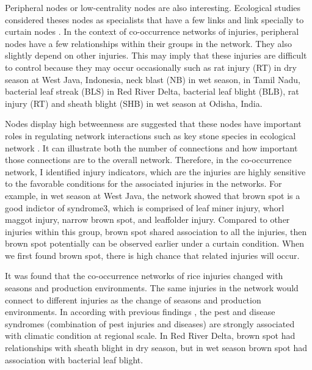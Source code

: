 Peripheral nodes or low-centrality nodes are also interesting. Ecological studies considered theses nodes as specialists that have a few links and link specially to curtain nodes \citep{Lu_2013_Soil, Borthagaray_2014_Inferring}. In the context of co-occurrence networks of injuries, peripheral nodes have a few relationships within their groups in the network. They also slightly depend on other injuries. This may imply that these injuries are difficult to control because they may occur occasionally such as rat injury (RT) in dry season at West Java, Indonesia, neck blast (NB) in wet season, in Tamil Nadu, bacterial leaf streak (BLS) in Red River Delta, bacterial leaf blight (BLB), rat injury (RT) and sheath blight (SHB) in wet season at Odisha, India.

Nodes display high betweenness are suggested that these nodes have important roles in regulating network interactions such as key stone species in ecological network \cite{Wright_2012_Microbial}. It can illustrate both the number of connections and how important those connections are to the overall network. Therefore, in the co-occurrence network, I identified injury indicators, which are the injuries are highly sensitive to the favorable conditions for the associated injuries in the networks. For example, in wet season at West Java, the network showed that brown spot is a good indictor of syndrome3, which is comprised of leaf miner injury, whorl maggot injury, narrow brown spot, and leaffolder injury. Compared to other injuries within this group, brown spot shared association to all the injuries, then brown spot potentially can be observed earlier under a curtain condition. When we first found brown spot, there is high chance that related injuries will occur. 

It was found that the co-occurrence networks of rice injuries changed with seasons and production environments. The same injuries in the network would connect to different injuries as the change of seasons and production environments. In according with previous findings \citep{Savary_2000_Characterization, Avelino_2006_Intensity, Savary_2012_Review} , the pest and disease syndromes (combination of pest injuries and diseases) are strongly associated with climatic condition at regional scale. In Red River Delta, brown spot had relationships with sheath blight in dry season, but in wet season brown spot had association with bacterial leaf blight. 

